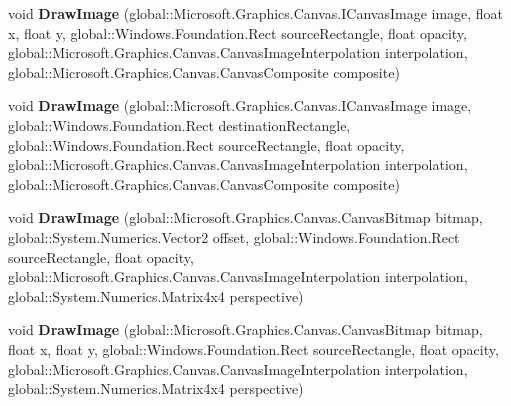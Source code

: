 \begin{DoxyCompactItemize}
\item 
\mbox{\label{interface_microsoft_1_1_graphics_1_1_canvas_1_1_i_canvas_drawing_session_a68dcdebbbb8491e7b5423f40b2a6349e}} 
void {\bfseries Draw\+Image} (global\+::\+Microsoft.\+Graphics.\+Canvas.\+I\+Canvas\+Image image, float x, float y, global\+::\+Windows.\+Foundation.\+Rect source\+Rectangle, float opacity, global\+::\+Microsoft.\+Graphics.\+Canvas.\+Canvas\+Image\+Interpolation interpolation, global\+::\+Microsoft.\+Graphics.\+Canvas.\+Canvas\+Composite composite)
\item 
\mbox{\label{interface_microsoft_1_1_graphics_1_1_canvas_1_1_i_canvas_drawing_session_a993f83bad2b787c45b41d577a3f93f10}} 
void {\bfseries Draw\+Image} (global\+::\+Microsoft.\+Graphics.\+Canvas.\+I\+Canvas\+Image image, global\+::\+Windows.\+Foundation.\+Rect destination\+Rectangle, global\+::\+Windows.\+Foundation.\+Rect source\+Rectangle, float opacity, global\+::\+Microsoft.\+Graphics.\+Canvas.\+Canvas\+Image\+Interpolation interpolation, global\+::\+Microsoft.\+Graphics.\+Canvas.\+Canvas\+Composite composite)
\item 
\mbox{\label{interface_microsoft_1_1_graphics_1_1_canvas_1_1_i_canvas_drawing_session_acf7e6993427ce05997a8eb83b4be05dc}} 
void {\bfseries Draw\+Image} (global\+::\+Microsoft.\+Graphics.\+Canvas.\+Canvas\+Bitmap bitmap, global\+::\+System.\+Numerics.\+Vector2 offset, global\+::\+Windows.\+Foundation.\+Rect source\+Rectangle, float opacity, global\+::\+Microsoft.\+Graphics.\+Canvas.\+Canvas\+Image\+Interpolation interpolation, global\+::\+System.\+Numerics.\+Matrix4x4 perspective)
\item 
\mbox{\label{interface_microsoft_1_1_graphics_1_1_canvas_1_1_i_canvas_drawing_session_a54c1165443e61a4fb85bec846c49b766}} 
void {\bfseries Draw\+Image} (global\+::\+Microsoft.\+Graphics.\+Canvas.\+Canvas\+Bitmap bitmap, float x, float y, global\+::\+Windows.\+Foundation.\+Rect source\+Rectangle, float opacity, global\+::\+Microsoft.\+Graphics.\+Canvas.\+Canvas\+Image\+Interpolation interpolation, global\+::\+System.\+Numerics.\+Matrix4x4 perspective)

\end{DoxyCompactItemize}

